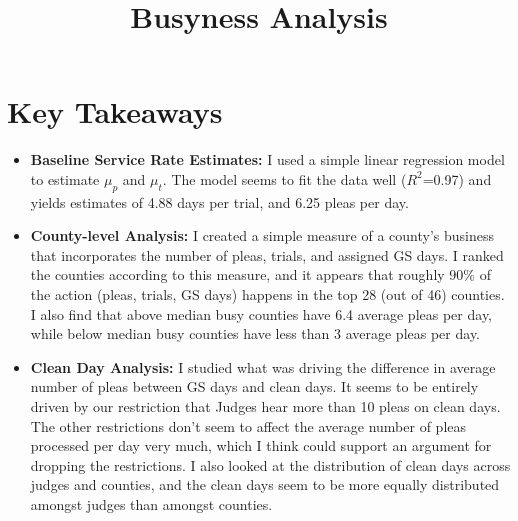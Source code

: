 \documentclass[11pt]{article}
\title{Busyness Analysis}
\begin{document}
\maketitle

\section{Key Takeaways}
  \begin{itemize}
    \item \textbf{Baseline Service Rate Estimates:} I used a simple linear regression model
    to estimate $\mu_p$ and $\mu_t$. The model seems to fit the data well ($R^2$=0.97) and
    yields estimates of 4.88 days per trial, and 6.25 pleas per day.

    \item \textbf{County-level Analysis:} I created a simple measure of a county's business
    that incorporates the number of pleas, trials, and assigned GS days. I ranked the counties
    according to this measure, and it appears that roughly $90\%$ of the action (pleas, trials, GS days)
    happens in the top 28 (out of 46) counties. I also find that above median busy counties
    have 6.4 average pleas per day, while below median busy counties have less than 3 average pleas per day.

    \item \textbf{Clean Day Analysis:} I studied what was driving the difference in average number of pleas
    between GS days and clean days. It seems to be entirely driven by our restriction that Judges hear more than
    10 pleas on clean days. The other restrictions don't seem to affect the average number of pleas processed per day very much,
    which I think could support an argument for dropping the restrictions. I also looked at the
    distribution of clean days across judges and counties, and the clean days seem to be
    more equally distributed amongst judges than amongst counties.
  \end{itemize}
\end{document}
